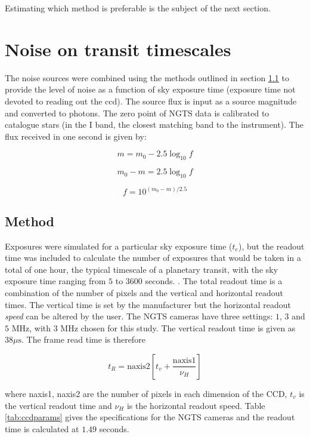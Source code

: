 \documentclass[11pt,a4paper]{report}
\begin{document}
Estimating which method is preferable is the subject of the next
section.

\section{Noise on transit timescales}

The noise sources were combined using the methods outlined in section
\ref{sec:method} to provide the level of noise as a function of sky
exposure time (exposure time not devoted to reading out the ccd). The
source flux is input as a source magnitude and converted to photons. The
zero point of NGTS data is calibrated to catalogue stars (in the I band,
the closest matching band to the instrument). The flux received in one
second is given by:

\[
    m = m_0 - 2.5 \log_{10}{f}
    \]

\[
    m_0 - m = 2.5 \log_{10}{f}
\]

\[
    f = 10^{(m_0 - m) / 2.5}
    \]


\subsection{Method}
\label{sec:method}

Exposures were simulated for a particular sky exposure time ($t_e$), 
but the
readout time was included to calculate the number of exposures that
would be taken in a total of one hour, the typical timescale of a
planetary transit, with the sky exposure time ranging from $5$ to $3600$
seconds. . The total readout time is a combination of the number
of pixels and the vertical and horizontal readout times. The vertical
time is set by the manufacturer but the horizontal readout \emph{speed}
can be altered by the user. The NGTS cameras have three settings: $1$,
$3$ and $5$ MHz, with $3$ MHz chosen for this study. The vertical
readout time is given as $38 \mu\mathrm{s}$. The frame read time is
therefore

\[
    t_R = \mathrm{naxis2} \left[t_v + \frac{\mathrm{naxis1}}{\nu_H}\right]
    \]

where naxis1, naxis2 are the number of pixels in each dimension of the
CCD, $t_v$ is the vertical readout time and $\nu_H$ is the horizontal
readout speed. Table \ref{tab:ccdparams} gives the specifications for
the NGTS cameras and the readout time is calculated at $1.49$ seconds.
\end{document}
